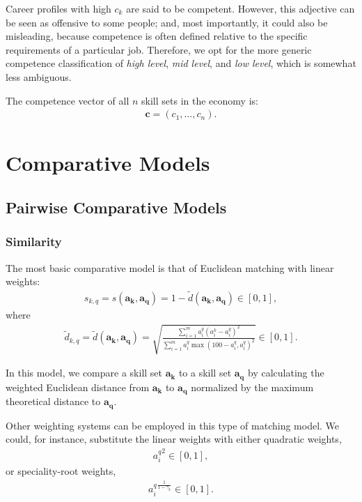 \documentclass{elsarticle} %
\begin{document}
Career profiles with high $c_k$ are said to be competent. However, this
adjective can be seen as offensive to some people; and, most importantly, it
could also be misleading, because competence is often defined relative to the
specific requirements of a particular job. Therefore, we opt for the more
generic competence classification of \textit{high level}, \textit{mid level},
and \textit{low level}, which is somewhat less ambiguous.

The competence vector of all $n$ skill sets in the economy is:
\begin{gather}
    \boldsymbol{c} = (c_1, \dots, c_n)
    .
\end{gather}


\section{Comparative Models}
\subsection{Pairwise Comparative Models}
\subsubsection{Similarity}
The most basic comparative model is that of Euclidean matching with linear
weights:
\begin{gather}
    s_{k,q} =
    s(\boldsymbol{a_k}, \boldsymbol{a_q}) =
    1 - \tilde{d}(\boldsymbol{a_k}, \boldsymbol{a_q})
    \in [0,1]
    ,
\end{gather}
where
\begin{gather}
    \tilde{d}_{k,q} =
    \tilde{d}(\boldsymbol{a_k}, \boldsymbol{a_q}) =
    \sqrt{
    \frac{
    \sum_{i = 1}^{m}{
    a_{i}^{q} (a_{i}^{k} - a_{i}^{q})^2
    }
    }{
    \sum_{i = 1}^{m}{
    a_{i}^{q} \max(100 - a_{i}^{q}, a_{i}^{q})^2
    }
    }
    }
    \in [0,1]
    .
\end{gather}

In this model, we compare a skill set $\boldsymbol{a_k}$ to a skill set
$\boldsymbol{a_q}$ by calculating the weighted Euclidean distance from
$\boldsymbol{a_k}$ to $\boldsymbol{a_q}$ normalized by the maximum theoretical
distance to $\boldsymbol{a_q}$.

Other weighting systems can be employed in this type of matching model. We
could, for instance, substitute the linear weights with either quadratic
weights,
\begin{gather}
    {a_{i}^{q}} ^ 2
    \in [0,1]
    ,
\end{gather}
or speciality-root weights,
\begin{gather}
    {a_{i}^{q}} ^ {
        \frac{1}{1 - \gamma_k}
    }
    \in [0,1]
    .
\end{gather}
\end{document}
